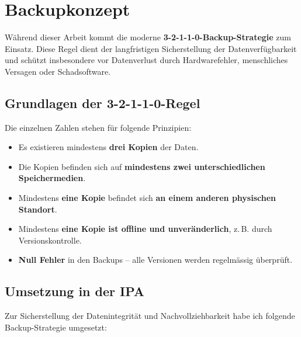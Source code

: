 \chapter{Backupkonzept}
\vspace{-3em}

Während dieser Arbeit kommt die moderne \textbf{3-2-1-1-0-Backup-Strategie} zum Einsatz. Diese Regel dient der langfristigen Sicherstellung der Datenverfügbarkeit und schützt insbesondere vor Datenverlust durch Hardwarefehler, menschliches Versagen oder Schadsoftware.

\section*{Grundlagen der 3-2-1-1-0-Regel}

Die einzelnen Zahlen stehen für folgende Prinzipien:

\begin{itemize}
  \item[3.] Es existieren mindestens \textbf{drei Kopien} der Daten.
  \item[2.] Die Kopien befinden sich auf \textbf{mindestens zwei unterschiedlichen Speichermedien}.
  \item[1.] Mindestens \textbf{eine Kopie} befindet sich \textbf{an einem anderen physischen Standort}.
  \item[1.] Mindestens \textbf{eine Kopie ist offline und unveränderlich}, z.\,B. durch Versionskontrolle.
  \item[0.] \textbf{Null Fehler} in den Backups – alle Versionen werden regelmässig überprüft.
\end{itemize}

\section*{Umsetzung in der IPA}

Zur Sicherstellung der Datenintegrität und Nachvollziehbarkeit habe ich folgende Backup-Strategie umgesetzt:


